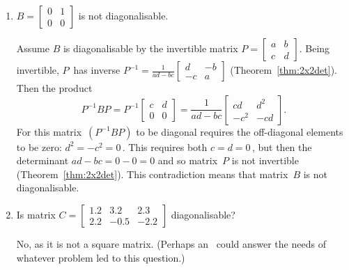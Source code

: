 \begin{example}
\begin{enumerate}
\item \label{eg:diagonaliseb}\(B=\begin{bmatrix} 0&1\\0&0 \end{bmatrix}\) is not diagonalisable.
\begin{solution} 
Assume \(B\) is diagonalisable by the invertible matrix \(P=\begin{bmatrix} a&b\\c&d \end{bmatrix}\).
Being invertible, \(P\)~has inverse \(P^{-1}=\frac1{ad-bc}\begin{bmatrix} d&-b\\-c&a \end{bmatrix}\)  (Theorem~\ref{thm:2x2det}).
Then the product
\begin{equation*}
P^{-1}BP=P^{-1}\begin{bmatrix} c&d\\0&0 \end{bmatrix}
=\frac1{ad-bc}\begin{bmatrix} cd&d^2\\-c^2&-cd \end{bmatrix}.
\end{equation*}
For this matrix~\((P^{-1}BP)\) to be diagonal requires the off-diagonal elements to be zero: \(d^2=-c^2=0\)\,.
This requires both \(c=d=0\)\,, but then the determinant \(ad-bc=0-0=0\) and so matrix~\(P\) is not invertible (Theorem~\ref{thm:2x2det}).
This contradiction means that matrix~\(B\) is not diagonalisable.
\end{solution}

\item Is matrix \(C=\begin{bmatrix}1.2& 3.2& 2.3
\\   2.2&-0.5&-2.2\end{bmatrix}\) diagonalisable?
\begin{solution} 
No, as it is not a square matrix.
(Perhaps an \svd\ could answer the needs of whatever problem led to this question.) 
\end{solution}

\end{enumerate}
\end{example}


